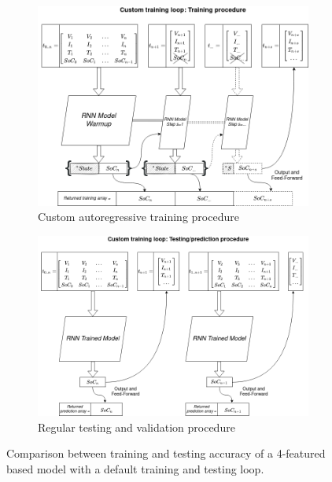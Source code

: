 \begin{figure}[htbp]
    \centering
    \begin{subfigure}[b]{0.85\textwidth}
        \centering
        \includegraphics[width=\linewidth]{II_Body/images/Autoregression-Training.png}
        \caption{Custom autoregressive training procedure}
        \label{subfig:testing}
    \end{subfigure}
    \hfill
    \begin{subfigure}[b]{0.85\textwidth}
        \centering
        \includegraphics[width=\linewidth]{II_Body/images/Autoregression-Testing.png}
        \caption{Regular testing and validation procedure}
        \label{subfig:training}
    \end{subfigure}
    \caption{Comparison between training and testing accuracy of a 4-featured based model with a default training and testing loop.}
    \label{fig:training_testing}
\end{figure}

